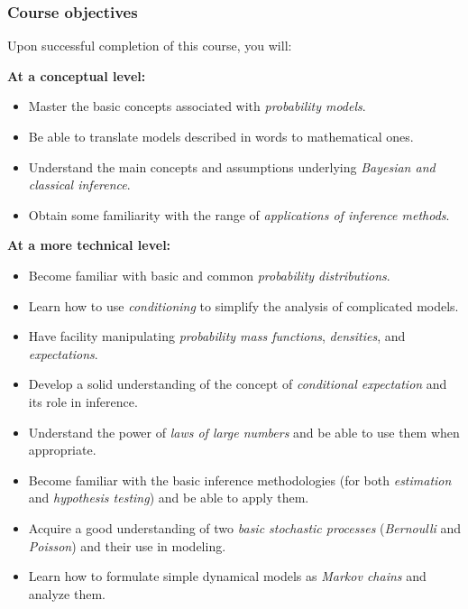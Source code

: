 \documentclass[pdftex, brazil, 12pt, twoside]{article}
\begin{document}
\subsubsection{Course objectives}
\label{ovw0-ci-obj}

Upon successful completion of this course, you will:

\textbf{At a conceptual level:}

\begin{itemize}[noitemsep]
\item Master the basic concepts associated with \emph{probability models}.
\item Be able to translate models described in words to mathematical ones.
\item Understand the main concepts and assumptions underlying \emph{Bayesian and classical inference}.
\item Obtain some familiarity with the range of \emph{applications of inference methods}.
\end{itemize}

\textbf{At a more technical level:}

\begin{itemize}[noitemsep]
\item Become familiar with basic and common \emph{probability distributions}.
\item Learn how to use \emph{conditioning} to simplify the analysis of complicated models.
\item Have facility manipulating \emph{probability mass functions}, \emph{densities}, and \emph{expectations}.
\item Develop a solid understanding of the concept of \emph{conditional expectation} and its role in inference.
\item Understand the power of \emph{laws of large numbers} and be able to use them when appropriate.
\item Become familiar with the basic inference methodologies (for both \emph{estimation} and \emph{hypothesis testing}) and be able to apply them.
\item Acquire a good understanding of two \emph{basic stochastic processes} (\emph{Bernoulli} and \emph{Poisson}) and their use in modeling.
\item Learn how to formulate simple dynamical models as \emph{Markov chains} and analyze them.
\end{itemize}

\end{document}
